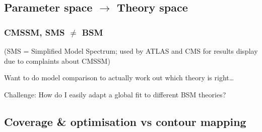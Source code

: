 \documentclass[xcolor=dvipsnames]{beamer}
\begin{document}
\subsection{Parameter space $\rightarrow$ Theory space}

\begin{frame}
\frametitle{CMSSM, SMS $\ne$ BSM}

(SMS = Simplified Model Spectrum; used by ATLAS and CMS for results display due to complaints about CMSSM)
\vspace{3mm}

Want to do model comparison to actually work out which theory is right\ldots
\vspace{3mm}

\begin{exampleblock}{Challenge:}
How do I easily adapt a global fit to different BSM theories?
\end{exampleblock}


\end{frame}

\subsection{Coverage \& optimisation vs contour mapping}
\end{document}
